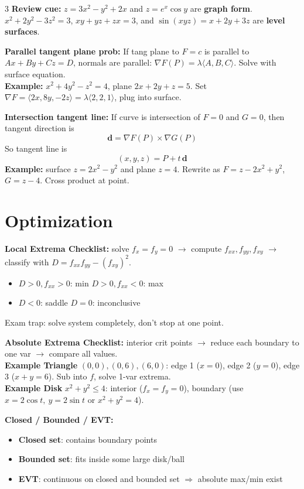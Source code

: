 \documentclass[12pt, landscape]{article}
\newcommand{\vct}[1]{\bm{#1}}
\newcommand{\grad}{\nabla}
\begin{document}
\begin{multicols}{3}
		\textbf{Review cue:} $z=3x^2-y^2+2x$ and $z=e^x\cos y$ are \textbf{graph form}. $x^2+2y^2-3z^2=3$, $xy+yz+zx=3$, and $\sin(xyz)=x+2y+3z$ are \textbf{level surfaces}.
		
		\textbf{Parallel tangent plane prob:} If tang plane to $F=c$ is parallel to $Ax+By+Cz=D$, normals are parallel: $\grad F(P)=\lambda \langle A,B,C\rangle$. Solve with surface equation.\\
		\textbf{Example:} $x^2+4y^2-z^2=4$, plane $2x+2y+z=5$. Set $\grad F=\langle 2x,8y,-2z\rangle=\lambda\langle 2,2,1\rangle$, plug into surface.
		
		\textbf{Intersection tangent line:}
		If curve is intersection of $F=0$ and $G=0$, then tangent direction is
		\[
		\vct d=\grad F(P)\times \grad G(P)
		\]
		So tangent line is
		\[
		(x,y,z)=P+t\,\vct d
		\]
		\textbf{Example:} surface $z=2x^2-y^2$ and plane $z=4$. Rewrite as $F=z-2x^2+y^2$, $G=z-4$. Cross product at point.
		
		\section{Optimization}
		\textbf{Local Extrema Checklist:} solve $f_x=f_y=0$ $\to$ compute $f_{xx},f_{yy},f_{xy}$ $\to$ classify with $D=f_{xx}f_{yy}-(f_{xy})^2$.
		\begin{itemize}
			\item $D>0, f_{xx}>0$: min \quad $D>0, f_{xx}<0$: max
			\item $D<0$: saddle \quad $D=0$: inconclusive
		\end{itemize}
		Exam trap: solve system completely, don't stop at one point.
		
		\textbf{Absolute Extrema Checklist:} interior crit points $\to$ reduce each boundary to one var $\to$ compare all values.\\
		\textbf{Example Triangle} $(0,0),(0,6),(6,0)$: edge 1 ($x=0$), edge 2 ($y=0$), edge 3 ($x+y=6$). Sub into $f$, solve 1-var extrema.\\
		\textbf{Example Disk} $x^2+y^2\le 4$: interior ($f_x=f_y=0$), boundary (use $x=2\cos t,\ y=2\sin t$ or $x^2+y^2=4$).
		
		\textbf{Closed / Bounded / EVT:}
		\begin{itemize}
			\item \textbf{Closed set}: contains boundary points
			\item \textbf{Bounded set}: fits inside some large disk/ball
			\item \textbf{EVT}: continuous on closed and bounded set $\Rightarrow$ absolute max/min exist
		\end{itemize}
		

\end{multicols}
\end{document}
